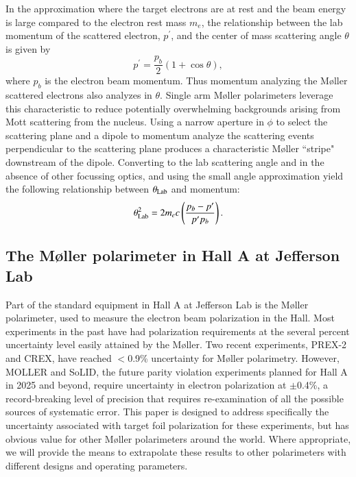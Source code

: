 \documentclass[preprint,12pt]{elsarticle}
\begin{document}
In the approximation where the target electrons are at rest and the beam energy is large compared to the electron rest mass $m_e$, the relationship between the lab momentum of the scattered electron, $p^{\prime}$, and the center of mass scattering angle $\theta$ is given by 
\begin{equation}
p^{\prime}=\frac{p_b}{2}\left(1+\cos\theta \right),
\label{eq:pvstheta}
\end{equation}
where $p_b$ is the electron beam momentum. Thus momentum analyzing the M\o ller scattered electrons also analyzes in $\theta$. Single arm M\o ller polarimeters leverage this characteristic to reduce potentially overwhelming backgrounds arising from Mott scattering from the nucleus. Using a narrow aperture in $\phi$ to select the scattering plane and a dipole to momentum analyze the scattering events perpendicular to the scattering plane produces a characteristic M\o ller ``stripe" downstream of the dipole. Converting to the lab scattering angle and in the absence of other focussing optics, and using the small angle approximation yield the following relationship between $\theta_{\rm Lab}$ and  momentum:
\begin{equation}
\theta^2_{\rm Lab}=2m_ec\left(\frac{p_b-p^{\prime}}{p^{\prime}p_b}\right).
\label{eq:theta_lab}
\end{equation}
\subsection{The M\o ller polarimeter in Hall A at Jefferson Lab}
Part of the standard equipment in Hall A at Jefferson Lab is the M\o ller polarimeter, used to measure the electron beam polarization in the Hall. Most experiments in the past have had polarization requirements at the several percent uncertainty level easily attained by the M\o ller. Two recent experiments, PREX-2\cite{PREX2021} and CREX, have reached $<$0.9\% uncertainty for M\o ller polarimetry. However,  MOLLER and SoLID, the future parity violation experiments planned for Hall A in 2025 and beyond, require uncertainty in electron polarization at $\pm$0.4\%, a record-breaking level of precision that requires re-examination of all the possible sources of systematic error. This paper is designed to address specifically the uncertainty associated with target foil polarization for these experiments, but has obvious value for other M\o ller polarimeters around the world. Where appropriate, we will provide the means to extrapolate these results to other polarimeters with different designs and operating parameters.
\end{document}
